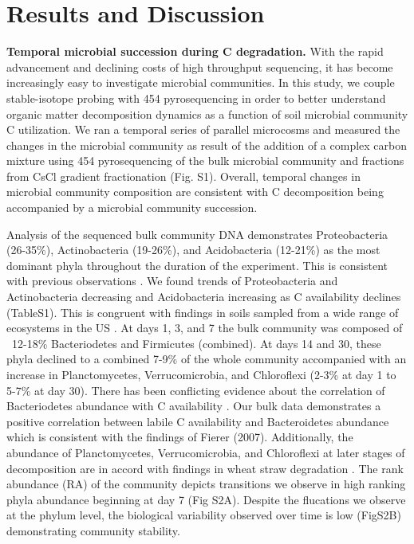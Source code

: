 \section{Results and Discussion}


\textbf{Temporal microbial succession during C degradation.} With the rapid advancement and declining costs of high throughput sequencing, it has become increasingly easy to investigate microbial communities.  In this study, we couple stable-isotope probing with 454 pyrosequencing in order to better understand organic matter decomposition dynamics as a function of soil microbial community C utilization. We ran a temporal series of parallel microcosms and measured the changes in the microbial community as result of the addition of a complex carbon mixture using 454 pyrosequencing of the bulk microbial community and fractions from CsCl gradient fractionation (Fig. S1). Overall, temporal changes in microbial community composition are consistent with C decomposition being accompanied by a microbial community succession. 

Analysis of the sequenced bulk community DNA demonstrates Proteobacteria (26-35\%), Actinobacteria (19-26\%), and Acidobacteria (12-21\%) as the most dominant phyla throughout the duration of the experiment. This is consistent with previous observations \cite{Goldfarb_2011, Fierer_2007, Rui_2009}. We found trends of Proteobacteria and Actinobacteria decreasing and Acidobacteria increasing as C availability declines (TableS1). This is congruent with findings in soils sampled from a wide range of ecosystems in the US \cite{Fierer_2007}. At days 1, 3, and 7 the bulk community was composed of ~12-18\% Bacteriodetes and Firmicutes (combined).  At days 14 and 30, these phyla declined to a combined 7-9\% of the whole community accompanied with an increase in Planctomycetes, Verrucomicrobia, and Chloroflexi (2-3\% at day 1 to 5-7\% at day 30). There has been conflicting evidence about the correlation of Bacteriodetes abundance with C availability \cite{Fierer_2007, Rui_2009, Sharp_2000}. Our bulk data demonstrates a positive correlation between labile C availability and Bacteroidetes abundance which is consistent with the findings of Fierer (2007). Additionally, the abundance of Planctomycetes, Verrucomicrobia, and Chloroflexi at later stages of decomposition are in accord with findings in wheat straw degradation \cite{Bastian_2009}. The rank abundance (RA) of the community depicts transitions we observe in high ranking phyla abundance beginning at day 7 (Fig S2A).  Despite the flucations we observe at the phylum level, the biological variability observed over time is low (FigS2B) demonstrating community stability.   


